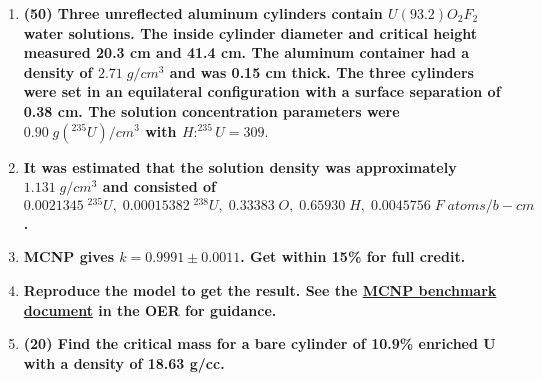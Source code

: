 \documentclass[11pt,a4paper]{article}
\begin{document}
\begin{enumerate}[leftmargin=*,topsep=0pt,font=\bfseries]
        \newpage 
    \item\textbf{(50) Three unreflected aluminum cylinders contain $U(93.2)O_2F_2$ water solutions. The inside cylinder diameter and critical height measured 20.3 cm and 41.4 cm. The aluminum container had a density of $2.71 \; g/cm^3$ and was 0.15 cm thick. The three cylinders were set in an equilateral configuration with a surface separation of 0.38 cm. The solution concentration parameters were $0.90 \; g(^{235}U)/cm^3$ with $H:^{235}U = 309$}.
    \item[]\textbf{It was estimated that the solution density was approximately $1.131 \; g/cm^3$ and consisted of $0.0021345\;^{235}U, \; 0.00015382\;^{238}U, \; 0.33383\;O, \; 0.65930\;H, \; 0.0045756\;F \; atoms/b-cm$.}
    \item[]\textbf{MCNP gives $k = 0.9991\pm0.0011$. Get within 15\% for full credit.} 
    \item[]\textbf{Reproduce the model to get the result. See the \href{https://courses.lumenlearning.com/uidaho-nuclear/chapter/mcnp/}{MCNP benchmark document} in the OER for guidance.}
        \vspace{0.25in}\\
























        \newpage 
    \item\textbf{(20) Find the critical mass for a bare cylinder of 10.9\% enriched U with a density of 18.63 g/cc.}
        \vspace{0.25in}\\

































\end{enumerate}
\end{document}
